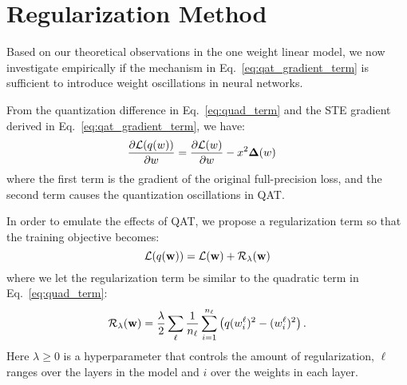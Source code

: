 \section{Regularization Method}\label{sec:method}

Based on our theoretical observations in the one weight linear model, we now investigate empirically if the mechanism in Eq.~\eqref{eq:qat_gradient_term} is sufficient to introduce weight oscillations in neural networks. 


From the quantization difference in Eq.~\ref{eq:quad_term} and the STE gradient derived in Eq.~\ref{eq:qat_gradient_term}, we have:
\begin{align}
    \frac{\partial \mathcal{L}(q(w))}{\partial w} &= \frac{\partial \mathcal{L}(w)}{\partial w} - x^2 \mathbf{\Delta}(w)
\end{align}
where the first term is the gradient of the original full-precision loss, and the second term 
causes the quantization oscillations in QAT.

In order to emulate the effects of QAT, we propose a regularization term so that the training objective becomes:
\begin{equation}
 \mathcal{L}(q(\mathbf{w})) = \mathcal{L}(\mathbf{w})  + \mathcal{R_\lambda}(\mathbf{w})
\end{equation}
where we let the regularization term be similar to the quadratic term in Eq.~\eqref{eq:quad_term}:
\begin{align}
\mathcal{R_\lambda}(\mathbf{w}) = \frac{\lambda}{2} \sum_{\ell} \frac{1}{n_\ell} \sum_{i=1}^{n_\ell} \left( q(w^\ell_{i})^2 - (w^\ell_{i})^2 \right).
\label{eq:regularization_equation}
\end{align}
Here $\lambda \geq 0$ is a hyperparameter that controls the amount of regularization, $\ell$ ranges over the layers in the model and $i$ over the weights in each layer.



